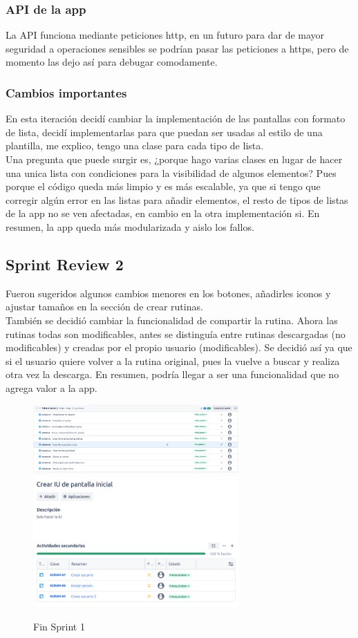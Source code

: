 \subsubsection{API de la app}
La API funciona mediante peticiones http, en un futuro para dar de mayor seguridad a operaciones sensibles se podrían pasar las peticiones a https, pero de momento las dejo así para debugar comodamente.

\subsubsection{Cambios importantes}
En esta iteración decidí cambiar la implementación de las pantallas con formato de lista, decidí implementarlas para que puedan ser usadas al estilo de una plantilla, me explico, tengo una clase para cada tipo de lista.\\

Una pregunta que puede surgir es, ¿porque hago varias clases en lugar de hacer una unica lista con condiciones para la visibilidad de algunos elementos? Pues porque el código queda más limpio y es más escalable, ya que si tengo que corregir algún error en las listas para añadir elementos, el resto de tipos de listas de la app no se ven afectadas, en cambio en la otra implementación si. En resumen, la app queda más modularizada y aislo los fallos.

\subsection{Sprint Review 2}
Fueron sugeridos algunos cambios menores en los botones, añadirles iconos y ajustar tamaños en la sección de crear rutinas.\\

También se decidió cambiar la funcionalidad de compartir la rutina. Ahora las rutinas todas son modificables, antes se distinguía entre rutinas descargadas (no modificables) y creadas por el propio usuario (modificables). Se decidió así ya que si el usuario quiere volver a la rutina original, pues la vuelve a buscar y realiza otra vez la descarga. En resumen, podría llegar a ser una funcionalidad que no agrega valor a la app.

\begin{figure}[h!]
  \centering
  \includegraphics[width=0.7\textwidth]{fotos/PostSprint2.png}
  \includegraphics[width=0.7\textwidth]{fotos/SubListPost2.png}
  \caption{Fin Sprint 1}
  \label{fig:imagen}
\end{figure}

\clearpage